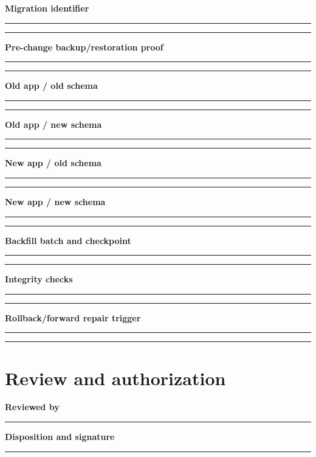 \documentclass[10pt,letterpaper]{article}
\begin{document}
\textbf{Migration identifier}\par
\noindent\rule{\linewidth}{0.35pt}\par\vspace{0.7em}
\noindent\rule{\linewidth}{0.35pt}\par\vspace{0.7em}
\textbf{Pre-change backup/restoration proof}\par
\noindent\rule{\linewidth}{0.35pt}\par\vspace{0.7em}
\noindent\rule{\linewidth}{0.35pt}\par\vspace{0.7em}
\textbf{Old app / old schema}\par
\noindent\rule{\linewidth}{0.35pt}\par\vspace{0.7em}
\noindent\rule{\linewidth}{0.35pt}\par\vspace{0.7em}
\textbf{Old app / new schema}\par
\noindent\rule{\linewidth}{0.35pt}\par\vspace{0.7em}
\noindent\rule{\linewidth}{0.35pt}\par\vspace{0.7em}
\textbf{New app / old schema}\par
\noindent\rule{\linewidth}{0.35pt}\par\vspace{0.7em}
\noindent\rule{\linewidth}{0.35pt}\par\vspace{0.7em}
\textbf{New app / new schema}\par
\noindent\rule{\linewidth}{0.35pt}\par\vspace{0.7em}
\noindent\rule{\linewidth}{0.35pt}\par\vspace{0.7em}
\textbf{Backfill batch and checkpoint}\par
\noindent\rule{\linewidth}{0.35pt}\par\vspace{0.7em}
\noindent\rule{\linewidth}{0.35pt}\par\vspace{0.7em}
\textbf{Integrity checks}\par
\noindent\rule{\linewidth}{0.35pt}\par\vspace{0.7em}
\noindent\rule{\linewidth}{0.35pt}\par\vspace{0.7em}
\textbf{Rollback/forward repair trigger}\par
\noindent\rule{\linewidth}{0.35pt}\par\vspace{0.7em}
\noindent\rule{\linewidth}{0.35pt}\par\vspace{0.7em}
\section{Review and authorization}
\textbf{Reviewed by}\par
\noindent\rule{\linewidth}{0.35pt}\par\vspace{0.7em}
\textbf{Disposition and signature}\par
\noindent\rule{\linewidth}{0.35pt}\par\vspace{0.7em}
\end{document}
